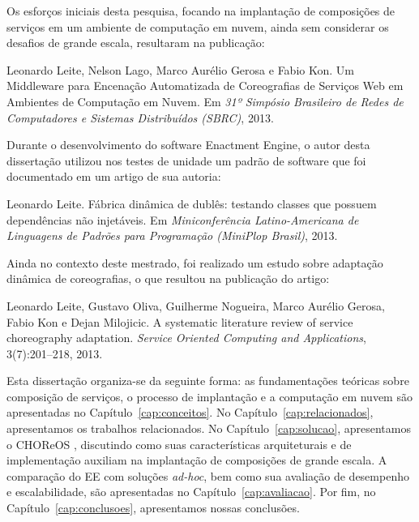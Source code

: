 Os esforços iniciais desta pesquisa, focando na implantação de composições de serviços em um ambiente de computação em nuvem, ainda sem considerar os desafios de grande escala, resultaram na publicação: \\

\begin{shadowblock}{15cm}
Leonardo Leite, Nelson Lago, Marco Aurélio Gerosa e Fabio Kon. Um Middleware para Encenação Automatizada de Coreografias de Serviços Web em Ambientes de Computação em Nuvem. Em \emph{31º Simpósio Brasileiro de Redes de Computadores e Sistemas Distribuídos (SBRC)}, 2013.
\end{shadowblock}

Durante o desenvolvimento do software Enactment Engine, o autor desta dissertação utilizou nos testes de unidade um padrão de software que foi documentado em um artigo de sua autoria: \\

\begin{shadowblock}{15cm}
Leonardo Leite. Fábrica dinâmica de dublês: testando classes que possuem dependências não injetáveis. Em \emph{Miniconferência Latino-Americana de Linguagens de Padrões para Programação (MiniPlop Brasil)}, 2013.
\end{shadowblock}

Ainda no contexto deste mestrado, foi realizado um estudo sobre adaptação dinâmica de coreografias, o que resultou na publicação do artigo: \\ 

\begin{shadowblock}{15cm}
Leonardo Leite, Gustavo Oliva, Guilherme Nogueira, Marco Aurélio Gerosa, Fabio Kon e Dejan Milojicic. A systematic literature review of service choreography adaptation. \emph{Service Oriented Computing and Applications}, 3(7):201--218, 2013.
\end{shadowblock}


Esta dissertação organiza-se da seguinte forma: as fundamentações teóricas sobre composição de serviços, o processo de implantação e a computação em nuvem são apresentadas no Capítulo~\ref{cap:conceitos}. No Capítulo~\ref{cap:relacionados}, apresentamos os trabalhos relacionados. No Capítulo~\ref{cap:solucao}, apresentamos o CHOReOS \ee, discutindo como suas características arquiteturais e de implementação auxiliam na implantação de composições de grande escala. A comparação do EE com soluções \emph{ad-hoc}, bem como sua avaliação de desempenho e escalabilidade, são apresentadas no Capítulo~\ref{cap:avaliacao}. Por fim, no Capítulo~\ref{cap:conclusoes}, apresentamos nossas conclusões.




